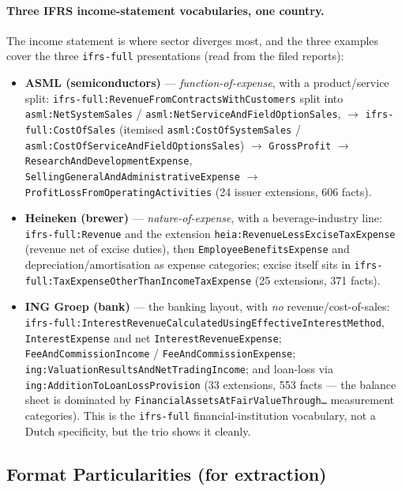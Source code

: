 \documentclass[11pt,a4paper]{report}
\begin{document}
\paragraph{Three IFRS income-statement vocabularies, one country.} The income statement is where sector
diverges most, and the three examples cover the three \texttt{ifrs-full} presentations (read from the filed
reports):
\begin{itemize}[nosep]
  \item \textbf{ASML (semiconductors)} --- \emph{function-of-expense}, with a product/service split:
    \texttt{ifrs-full:RevenueFromContractsWithCustomers} split into \texttt{asml:NetSystemSales} /
    \texttt{asml:NetServiceAndFieldOptionSales}, \(\to\) \texttt{ifrs-full:CostOfSales} (itemised
    \texttt{asml:CostOfSystemSales} / \texttt{asml:CostOfServiceAndFieldOptionsSales}) \(\to\)
    \texttt{GrossProfit} \(\to\) \texttt{ResearchAndDevelopmentExpense},
    \texttt{SellingGeneralAndAdministrativeExpense} \(\to\) \texttt{ProfitLossFromOperatingActivities} (24
    issuer extensions, 606 facts).
  \item \textbf{Heineken (brewer)} --- \emph{nature-of-expense}, with a beverage-industry line:
    \texttt{ifrs-full:Revenue} and the extension \texttt{heia:RevenueLessExciseTaxExpense} (revenue net of
    excise duties), then \texttt{EmployeeBenefitsExpense} and depreciation/amortisation as expense categories;
    excise itself sits in \texttt{ifrs-full:TaxExpenseOtherThanIncomeTaxExpense} (25 extensions, 371 facts).
  \item \textbf{ING Groep (bank)} --- the banking layout, with \emph{no} revenue/cost-of-sales:
    \texttt{ifrs-full:InterestRevenueCalculatedUsingEffectiveInterestMethod}, \texttt{InterestExpense} and net
    \texttt{InterestRevenueExpense}; \texttt{FeeAndCommissionIncome} / \texttt{FeeAndCommissionExpense};
    \texttt{ing:ValuationResultsAndNetTradingIncome}; and loan-loss via
    \texttt{ing:AdditionToLoanLossProvision} (33 extensions, 553 facts --- the balance sheet is dominated by
    \texttt{FinancialAssetsAtFairValueThrough\ldots} measurement categories). This is the \texttt{ifrs-full}
    financial-institution vocabulary, not a Dutch specificity, but the trio shows it cleanly.
\end{itemize}

\subsection{Format Particularities (for extraction)}
\end{document}
